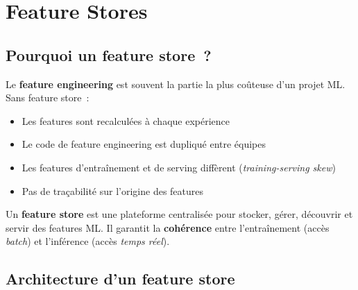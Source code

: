\section{Feature Stores}
\label{sec:feature-stores}

\subsection{Pourquoi un feature store~?}

Le \textbf{feature engineering} est souvent la
partie la plus co\^uteuse d'un projet ML. Sans feature store~:
\begin{itemize}
  \item Les features sont recalcul\'ees \`a chaque exp\'erience
  \item Le code de feature engineering est dupliqu\'e entre \'equipes
  \item Les features d'entra\^inement et de serving diff\`erent
    (\emph{training-serving skew})
  \item Pas de tra\c{c}abilit\'e sur l'origine des features
\end{itemize}

\begin{definition}
Un \textbf{feature store} est une plateforme centralis\'ee pour stocker,
g\'erer, d\'ecouvrir et servir des features ML. Il garantit la
\textbf{coh\'erence} entre l'entra\^inement (acc\`es \emph{batch}) et
l'inf\'erence (acc\`es \emph{temps r\'eel}).
\end{definition}

\subsection{Architecture d'un feature store}

